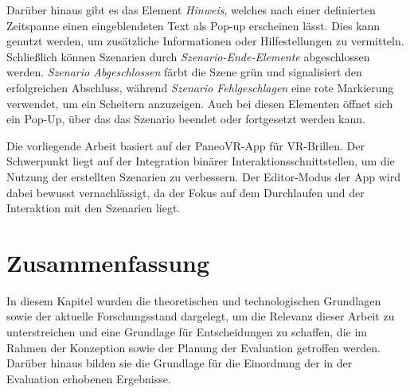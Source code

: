 Darüber hinaus gibt es das Element \textit{Hinweis}, welches nach einer definierten Zeitspanne einen eingeblendeten Text als Pop-up erscheinen lässt. Dies kann genutzt werden, um zusätzliche Informationen oder Hilfestellungen zu vermitteln. Schließlich können Szenarien durch \textit{Szenario-Ende-Elemente} abgeschlossen werden. \textit{Szenario Abgeschlossen} färbt die Szene grün und signalisiert den erfolgreichen Abschluss, während \textit{Szenario Fehlgeschlagen} eine rote Markierung verwendet, um ein Scheitern anzuzeigen. Auch bei diesen Elementen öffnet sich ein Pop-Up, über das das Szenario beendet oder fortgesetzt werden kann.

Die vorliegende Arbeit basiert auf der PaneoVR-App für VR-Brillen. Der Schwerpunkt liegt auf der Integration binärer Interaktionsschnittstellen, um die Nutzung der erstellten Szenarien zu verbessern. Der Editor-Modus der App wird dabei bewusst vernachlässigt, da der Fokus auf dem Durchlaufen und der Interaktion mit den Szenarien liegt.

\section{Zusammenfassung} 

In diesem Kapitel wurden die theoretischen und technologischen Grundlagen sowie der aktuelle Forschungsstand dargelegt, um die Relevanz dieser Arbeit zu unterstreichen und eine Grundlage für Entscheidungen zu schaffen, die im Rahmen der Konzeption sowie der Planung der Evaluation getroffen werden. Darüber hinaus bilden sie die Grundlage für die Einordnung der in der Evaluation erhobenen Ergebnisse.

